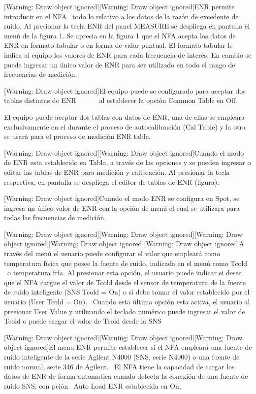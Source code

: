 \documentclass[paper=letter,oneside,fontsize=10pt,parskip=full]{article}
\newcounter{Table}
\begin{document}
[Warning: Draw object ignored][Warning: Draw object ignored]ENR permite introducir en el NFA \ todo lo relativo a los
datos de la razón de excedente de ruido. Al presionar la tecla ENR del panel MEASURE se despliega en pantalla el menú
de la figura 1. Se aprecia en la figura 1 que el NFA acepta los datos de ENR en formato tabular o en forma de valor
puntual. El formato tabular le indica al equipo los valores de ENR para cada frecuencia de interés. En cambio se puede
ingresar un único valor de ENR para ser utilizado en todo el rango de frecuencias de medición.

[Warning: Draw object ignored]El equipo puede se configurado para aceptar dos tablas distintas de ENR \ \ \ \ \ \ al
establecer la opción Common Table en Off. 

El equipo puede aceptar dos tablas con datos de ENR, una de ellas se empleara exclusivamente en el durante el proceso de
autocalibración (Cal Table) y la otra se usará para el proceso de medición ENR table.

[Warning: Draw object ignored][Warning: Draw object ignored]Cuando el modo de ENR esta establecido en Tabla, a través de
las opciones y se pueden ingresar o editar las tablas de ENR para medición y calibración. Al presionar la tecla
respectiva, en pantalla se despliega el editor de tablas de ENR (figura). 

[Warning: Draw object ignored]Cuando el modo ENR se configura en Spot, se ingresa un único valor de ENR con la opción de
menú el cual se utilizara para todas las frecuencias de medición.

[Warning: Draw object ignored][Warning: Draw object ignored][Warning: Draw object ignored][Warning: Draw object
ignored][Warning: Draw object ignored]A través del menú el usuario puede configurar el valor que empleará como
temperatura física que posee la fuente de ruido, indicada en el menú como Tcold \ o temperatura fría. Al presionar esta
opción, el usuario puede indicar si desea que el NFA cargue el valor de Tcold desde el sensor de temperatura de la
fuente de ruido inteligente (SNS Tcold = On) o si debe tomar el valor establecido por el usuario (User Tcold = On).
\ Cuando esta última opción esta activa, el usuario al presionar User Value y utilizando el teclado numérico puede
ingresar el valor de Tcold o puede cargar el valor de Tcold desde la SNS

[Warning: Draw object ignored][Warning: Draw object ignored][Warning: Draw object ignored]El menu ENR permite establecer
si el NFA empleará una fuente de ruido inteligente de la serie Agilent N4000 (SNS, serie N4000) o una fuente de ruido
normal, serie 346 de Agilent. \ El NFA tiene la capacidad de cargar los datos de ENR de forma automatica cuando detecta
la conexión de una fuente de ruido SNS, con pción \ Auto Load ENR establecida en On, 
\end{document}
